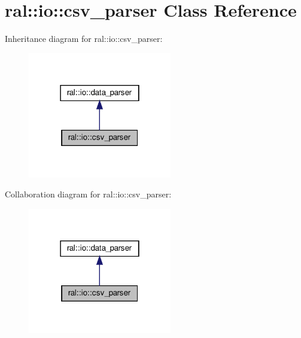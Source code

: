 \hypertarget{classral_1_1io_1_1csv__parser}{}\section{ral\+:\+:io\+:\+:csv\+\_\+parser Class Reference}
\label{classral_1_1io_1_1csv__parser}


Inheritance diagram for ral\+:\+:io\+:\+:csv\+\_\+parser\+:\nopagebreak
\begin{figure}[H]
\begin{center}
\leavevmode
\includegraphics[width=178pt]{classral_1_1io_1_1csv__parser__inherit__graph}
\end{center}
\end{figure}


Collaboration diagram for ral\+:\+:io\+:\+:csv\+\_\+parser\+:\nopagebreak
\begin{figure}[H]
\begin{center}
\leavevmode
\includegraphics[width=178pt]{classral_1_1io_1_1csv__parser__coll__graph}
\end{center}
\end{figure}

